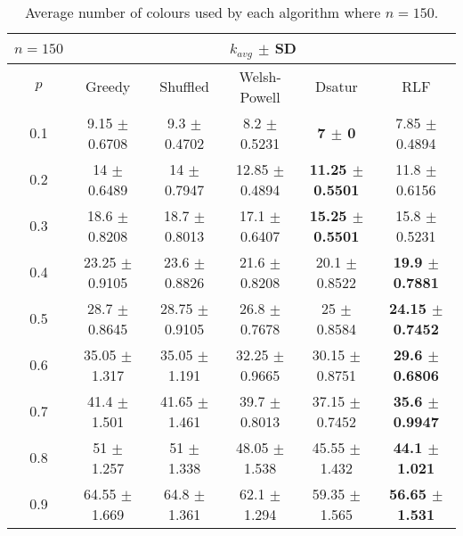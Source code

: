 \begin{table}[H]
    \centering
    \begin{tabular}{cccccc}
        
        $n = 150$& \multicolumn{5}{c}{$k_{avg}$ $\pm$ SD} \\
        \hline
        $p$ & Greedy & Shuffled & Welsh-Powell & Dsatur & RLF \\
        \hline
        0.1 & 9.15 $\pm$ 0.6708 & 9.3 $\pm$ 0.4702 & 8.2 $\pm$ 0.5231 & \textbf{7 $\pm$ 0} & 7.85 $\pm$ 0.4894 \\
        0.2 & 14 $\pm$ 0.6489 & 14 $\pm$ 0.7947 & 12.85 $\pm$ 0.4894 & \textbf{11.25 $\pm$ 0.5501} & 11.8 $\pm$ 0.6156 \\
        0.3 & 18.6 $\pm$ 0.8208 & 18.7 $\pm$ 0.8013 & 17.1 $\pm$ 0.6407 & \textbf{15.25 $\pm$ 0.5501} & 15.8 $\pm$ 0.5231 \\
        0.4 & 23.25 $\pm$ 0.9105 & 23.6 $\pm$ 0.8826 & 21.6 $\pm$ 0.8208 & 20.1 $\pm$ 0.8522 & \textbf{19.9 $\pm$ 0.7881} \\
        0.5 & 28.7 $\pm$ 0.8645 & 28.75 $\pm$ 0.9105 & 26.8 $\pm$ 0.7678 & 25 $\pm$ 0.8584 & \textbf{24.15 $\pm$ 0.7452} \\
        0.6 & 35.05 $\pm$ 1.317 & 35.05 $\pm$ 1.191 & 32.25 $\pm$ 0.9665 & 30.15 $\pm$ 0.8751 & \textbf{29.6 $\pm$ 0.6806} \\
        0.7 & 41.4 $\pm$ 1.501 & 41.65 $\pm$ 1.461 & 39.7 $\pm$ 0.8013 & 37.15 $\pm$ 0.7452 & \textbf{35.6 $\pm$ 0.9947} \\
        0.8 & 51 $\pm$ 1.257 & 51 $\pm$ 1.338 & 48.05 $\pm$ 1.538 & 45.55 $\pm$ 1.432 & \textbf{44.1 $\pm$ 1.021} \\
        0.9 & 64.55 $\pm$ 1.669 & 64.8 $\pm$ 1.361 & 62.1 $\pm$ 1.294 & 59.35 $\pm$ 1.565 & \textbf{56.65 $\pm$ 1.531} \\
        \hline
    \end{tabular}
    \caption{Average number of colours used by each algorithm where $n = 150$.}
    \label{tab:avgKforV150}
\end{table}


